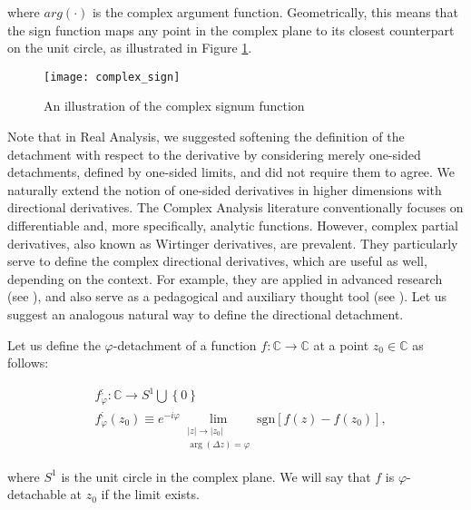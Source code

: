 \documentclass[11pt]{book}
\begin{document}
where $arg\left(\cdot\right)$ is the complex argument function. Geometrically, this means that the sign function maps any point in the complex plane to its closest counterpart on the unit circle, as illustrated in Figure \ref{complex_sign_fig}.

\begin{figure}
\texttt{[image: complex\_sign]}
\caption{An illustration of the complex signum function}
\label{complex_sign_fig}
\end{figure}

Note that in Real Analysis, we suggested softening the definition of the detachment with respect to the derivative by considering merely one-sided detachments, defined by one-sided limits, and did not require them to agree. We naturally extend the notion of one-sided derivatives in higher dimensions with directional derivatives. The Complex Analysis literature conventionally focuses on differentiable and, more specifically, analytic functions. However, complex partial derivatives, also known as Wirtinger derivatives, are prevalent. They particularly serve to define the complex directional derivatives, which are useful as well, depending on the context. For example, they are applied in advanced research (see \cite{dructu2018geometric}), and also serve as a pedagogical and auxiliary thought tool (see \cite{shabat2003introduction}). Let us suggest an analogous natural way to define the directional detachment.

\begin{definition}\label{complex_detachment_definition} Let us define the $\varphi$-detachment of a function $f:\mathbb{C}\longrightarrow\mathbb{C}$ at a point $z_{0}\in\mathbb{C}$ as follows:

$$\begin{array}{ccc}
& f_{\varphi}^{;}:\mathbb{C}\longrightarrow S^{1}\bigcup\left\{ 0\right\} \\
& f_{\varphi}^{;}\left(z_{0}\right)\equiv e^{-i\varphi}\underset{\begin{array}{c}
\left|z\right|\to\left|z_{0}\right|\\
\arg\left(\Delta z\right)=\varphi
\end{array}}{\lim}\text{sgn}\left[f\left(z\right)-f\left(z_{0}\right)\right],
\end{array}$$

where $S^{1}$ is the unit circle in the complex plane. We will say that $f$ is $\varphi$-detachable at $z_{0}$ if the limit exists.
\end{definition}
\end{document}
